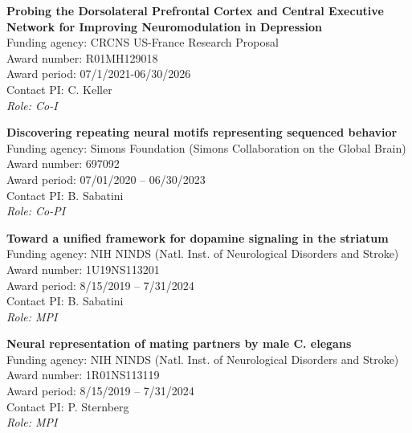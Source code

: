 \documentclass[10pt]{article}
\begin{document}
\begin{outerlist}
\item \textbf{Probing the Dorsolateral Prefrontal Cortex and Central Executive Network for Improving Neuromodulation in Depression} \\
  Funding agency: CRCNS US-France Research Proposal \\
  Award number: R01MH129018 \\
  Award period: 07/1/2021-06/30/2026 \\
  Contact PI: C. Keller  \\
  \textit{Role: Co-I}

\item \textbf{Discovering repeating neural motifs representing sequenced behavior} \\
  Funding agency: Simons Foundation (Simons Collaboration on the Global Brain) \\
  Award number: 697092 \\
  Award period: 07/01/2020 -- 06/30/2023 \\
  Contact PI: B. Sabatini \\
  \textit{Role: Co-PI}


\item \textbf{Toward a unified framework for dopamine signaling in the striatum} \\
  Funding agency: NIH NINDS (Natl. Inst. of Neurological Disorders and Stroke) \\
  Award number: 1U19NS113201 \\
  Award period: 8/15/2019 -- 7/31/2024 \\
  Contact PI: B. Sabatini \\
  \textit{Role: MPI}

\item \textbf{Neural representation of mating partners by male C. elegans}\\
  Funding agency: NIH NINDS (Natl. Inst. of Neurological Disorders and Stroke) \\
  Award number: 1R01NS113119 \\
  Award period: 8/15/2019 -- 7/31/2024 \\
  Contact PI: P. Sternberg\\
  \textit{Role: MPI}

\end{outerlist}
\end{document}
